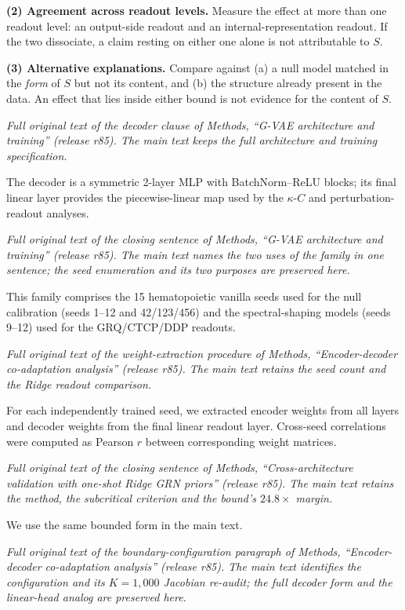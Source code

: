 \documentclass[11 pt,a4 paper]{article}
\begin{document}
\textbf{(2) Agreement across readout levels.} Measure the effect at more than one
readout level: an output-side readout and an internal-representation readout. If
the two dissociate, a claim resting on either one alone is not attributable to
$S$.

\textbf{(3) Alternative explanations.} Compare against (a) a null model matched
in the \emph{form} of $S$ but not its content, and (b) the structure already
present in the data. An effect that lies inside either bound is not evidence for
the content of $S$.

\noindent\emph{Full original text of the decoder clause of Methods, ``G-VAE architecture and training'' (release r85). The main text keeps the full architecture and training specification.}

The decoder is a symmetric 2-layer MLP with BatchNorm--ReLU blocks; its final linear layer provides the piecewise-linear map used by the $\kappa$-$C$ and perturbation-readout analyses.

\noindent\emph{Full original text of the closing sentence of Methods, ``G-VAE architecture and training'' (release r85). The main text names the two uses of the family in one sentence; the seed enumeration and its two purposes are preserved here.}

This family comprises the 15 hematopoietic vanilla seeds used for the null calibration (seeds 1--12 and 42/123/456) and the spectral-shaping models (seeds 9--12) used for the GRQ/CTCP/DDP readouts.

\noindent\emph{Full original text of the weight-extraction procedure of Methods, ``Encoder-decoder co-adaptation analysis'' (release r85). The main text retains the seed count and the Ridge readout comparison.}

For each independently trained seed, we extracted encoder weights from all layers and decoder weights from the final linear readout layer. Cross-seed correlations were computed as Pearson $r$ between corresponding weight matrices.

\noindent\emph{Full original text of the closing sentence of Methods, ``Cross-architecture validation with one-shot Ridge GRN priors'' (release r85). The main text retains the method, the subcritical criterion and the bound's $24.8\times$ margin.}

We use the same bounded form in the main text.

\noindent\emph{Full original text of the boundary-configuration paragraph of Methods, ``Encoder-decoder co-adaptation analysis'' (release r85). The main text identifies the configuration and its $K=1{,}000$ Jacobian re-audit; the full decoder form and the linear-head analog are preserved here.}
\end{document}
